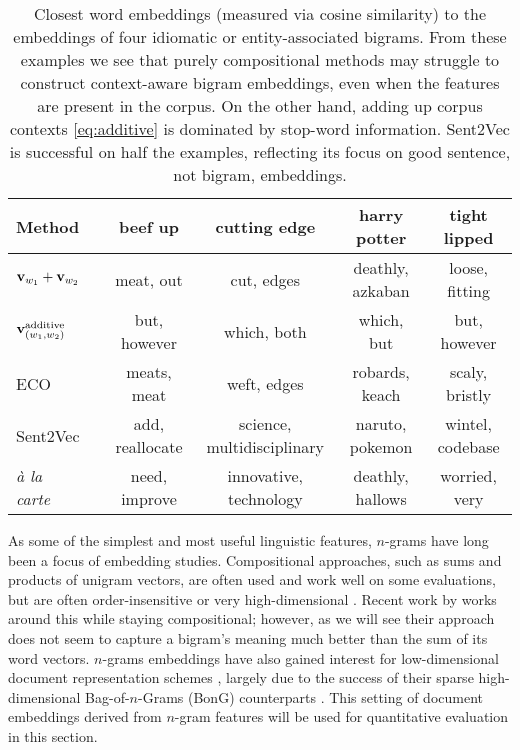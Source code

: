 \documentclass[11pt,a4paper]{article}
\begin{document}
\begin{table*}[t!]
	\centering
	\begin{threeparttable}
		\begin{tabular}{lccccc}
			Method && beef up & cutting edge & harry potter & tight lipped \\
			\toprule
			${\bf v}_{w_1}+{\bf v}_{w_2}$ && meat, out & cut, edges & deathly, azkaban & loose, fitting \\
			${\bf v}_{(w_1,w_2)}^\textrm{additive}$ && but, however & which, both & which, but & but, however \\
			ECO && meats, meat & weft, edges & robards, keach & scaly, bristly \\
			Sent2Vec && add, reallocate & science, multidisciplinary & naruto, pokemon & wintel, codebase \\
			{\em\`a la carte} && need, improve & innovative, technology & deathly, hallows & worried, very \\
			\bottomrule
		\end{tabular}
	\end{threeparttable}
	\caption{\label{tbl:bigrams}
		Closest word embeddings (measured via cosine similarity) to the embeddings of four idiomatic or entity-associated bigrams.
		From these examples we see that purely compositional methods may struggle to construct context-aware bigram embeddings, even when the features are present in the corpus.
		On the other hand, adding up corpus contexts \eqref{eq:additive} is dominated by stop-word information.
		Sent2Vec is successful on half the examples, reflecting its focus on good sentence, not bigram, embeddings.
	}
\end{table*}
 
As some of the simplest and most useful linguistic features, $n$-grams have long been a focus of embedding studies.
Compositional approaches, such as sums and products of unigram vectors, are often used and work well on some evaluations, but are often order-insensitive or very high-dimensional \cite{Mitchell:10}.
Recent work by \citet{Poliak:17} works around this while staying compositional;
however, as we will see their approach does not seem to capture a bigram's meaning much better than the sum of its word vectors.
$n$-grams embeddings have also gained interest for low-dimensional document representation schemes \cite{Hill:16,Pagliardini:18,Arora:18a}, largely due to the success of their sparse high-dimensional Bag-of-$n$-Grams (BonG) counterparts \cite{Wang:12}.
This setting of document embeddings derived from $n$-gram features will be used for quantitative evaluation in this section.
\end{document}
